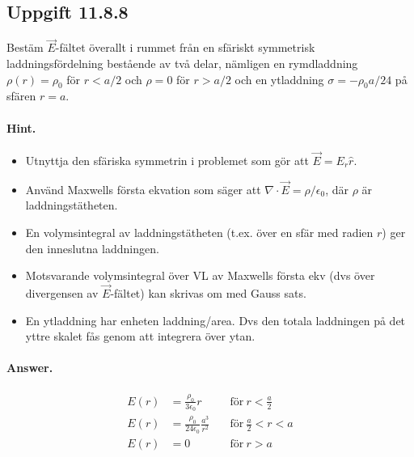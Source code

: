 \documentclass[%
oneside,                 %
final,                   %
10pt]{article}
\newenvironment{doconceexercise}{}{}
\newcounter{doconceexercisecounter}
\begin{document}
\begin{doconceexercise}

\subsection{Uppgift 11.8.8}

Bestäm $\vec{E}$-fältet överallt i rummet från en sfäriskt symmetrisk laddningsfördelning bestående av två delar, nämligen en rymdladdning $\rho(r) = \rho_0$ för $r< a/2$ och $\rho = 0$ för $r > a/2$ och en ytladdning $\sigma = -\rho_0 a/24$ på sfären $r = a$.


\paragraph{Hint.}
\begin{itemize}
\item Utnyttja den sfäriska symmetrin i problemet som gör att $\vec{E} = E_r \hat{r}$.

\item Använd Maxwells första ekvation som säger att $\nabla \cdot \vec{E} = \rho / \epsilon_0$, där $\rho$ är laddningstätheten.

\item En volymsintegral av laddningstätheten (t.ex. över en sfär med radien $r$) ger den inneslutna laddningen.

\item Motsvarande volymsintegral över VL av Maxwells första ekv (dvs över divergensen av $\vec{E}$-fältet) kan skrivas om med Gauss sats.

\item En ytladdning har enheten laddning/area. Dvs den totala laddningen på det yttre skalet fås genom att integrera över ytan.
\end{itemize}

\noindent


\paragraph{Answer.}
\begin{align}
E\left(r\right) &= \frac{\rho_0}{3 \epsilon_0} r \quad & \mathrm{för~} r < \frac{a}{2} \\
E\left(r\right) &=\frac{\rho_0}{24\epsilon_0} \frac{a^3}{r^2} \quad & \mathrm{för~} \frac{a}{2} < r < a \\
E\left(r\right) &= 0 \quad & \mathrm{för~} r > a
\end{align}


\end{doconceexercise}
\end{document}
